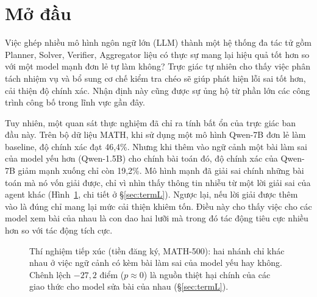 \documentclass[11pt,a4paper]{article}
\begin{document}
\section{Mở đầu}\label{sec:intro}

Việc ghép nhiều mô hình ngôn ngữ lớn (LLM) thành một hệ thống đa tác tử gồm Planner, Solver, Verifier, Aggregator liệu có thực sự mang lại hiệu quả tốt hơn so với một model mạnh đơn lẻ tự làm không? Trực giác tự nhiên cho thấy việc phân tách nhiệm vụ và bổ sung cơ chế kiểm tra chéo sẽ giúp phát hiện lỗi sai tốt hơn, cải thiện độ chính xác. Nhận định này cũng được sự ủng hộ từ phần lớn các công trình công bố trong lĩnh vực gần đây.

Tuy nhiên, một quan sát thực nghiệm đã chỉ ra tính bất ổn của trực giác ban đầu này. Trên bộ dữ liệu MATH, khi sử dụng một mô hình Qwen-7B đơn lẻ làm baseline, độ chính xác đạt 46,4\%. Nhưng khi thêm vào ngữ cảnh một bài làm sai của model yếu hơn (Qwen-1.5B) cho chính bài toán đó, độ chính xác của Qwen-7B giảm mạnh xuống chỉ còn 19,2\%. Mô hình mạnh đã giải sai chính những bài toán mà nó vốn giải được, chỉ vì nhìn thấy thông tin nhiễu từ một lời giải sai của agent khác
(Hình~\ref{fig:exposure}, chi tiết ở \S\ref{sec:termL}). Ngược lại, nếu lời giải được thêm vào là đúng chỉ mang lại mức cải thiện khiêm tốn. Điều này cho thấy việc cho các model xem bài của nhau là con dao hai lưỡi mà trong đó tác động tiêu cực nhiều hơn so với tác động tích cực.

\begin{figure}[t]\centering
{}
\caption{Thí nghiệm tiếp xúc (tiền đăng ký, MATH-500): hai nhánh chỉ khác nhau ở việc ngữ cảnh
có kèm bài làm sai của model yếu hay không. Chênh lệch $-27{,}2$ điểm ($p \approx 0$) là nguồn
thiệt hại chính của các giao thức cho model sửa bài của nhau (\S\ref{sec:termL}).}
\label{fig:exposure}
\end{figure}
\end{document}
